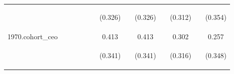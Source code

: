 \begin{center}
\begin{tabular}{lcccccccccccc}
\vspace{4pt} & \begin{footnotesize}\end{footnotesize} & \begin{footnotesize}\end{footnotesize} & \begin{footnotesize}\end{footnotesize} & \begin{footnotesize}\end{footnotesize} & \begin{footnotesize}\end{footnotesize} & \begin{footnotesize}(0.326)\end{footnotesize} & \begin{footnotesize}\end{footnotesize} & \begin{footnotesize}(0.326)\end{footnotesize} & \begin{footnotesize}\end{footnotesize} & \begin{footnotesize}(0.312)\end{footnotesize} & \begin{footnotesize}\end{footnotesize} & \begin{footnotesize}(0.354)\end{footnotesize} \\
1970.cohort\_ceo &  &  &  &  &  & 0.413 &  & 0.413 &  & 0.302 &  & 0.257 \\
\vspace{4pt} & \begin{footnotesize}\end{footnotesize} & \begin{footnotesize}\end{footnotesize} & \begin{footnotesize}\end{footnotesize} & \begin{footnotesize}\end{footnotesize} & \begin{footnotesize}\end{footnotesize} & \begin{footnotesize}(0.341)\end{footnotesize} & \begin{footnotesize}\end{footnotesize} & \begin{footnotesize}(0.341)\end{footnotesize} & \begin{footnotesize}\end{footnotesize} & \begin{footnotesize}(0.316)\end{footnotesize} & \begin{footnotesize}\end{footnotesize} & \begin{footnotesize}(0.348)\end{footnotesize} \\

\end{tabular}
\end{center}

